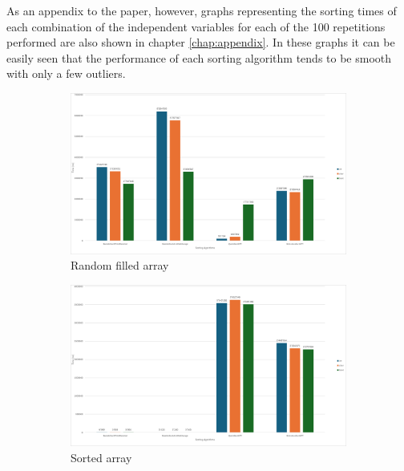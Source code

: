 \documentclass{article}
\begin{document}
    As an appendix to the paper, however, graphs representing the sorting times of each combination of the independent variables for each of the 100 repetitions performed are also shown in chapter \ref{chap:appendix}. In these graphs it can be easily seen that the performance of each sorting algorithm tends to be smooth with only a few outliers.
    
    \begin{figure}[!h]
        \centering
        \begin{subfigure}{0.7\textwidth}
            \includegraphics[width=1\linewidth]{avg1000rand.png}
            \caption{Random filled array}
            \label{fig:avg1000sort}
        \end{subfigure}
        \begin{subfigure}{0.45\textwidth}
            \includegraphics[width=1\linewidth]{avg1000sort.png}
            \caption{Sorted array}
            \label{fig:avg1000sort}
        \end{subfigure}
        \hfill
        \begin{subfigure}{0.45\textwidth}

\end{subfigure}
\end{figure}
\end{document}
